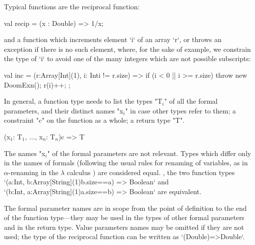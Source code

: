 \begin{ex}Typical functions are the reciprocal function: 
\begin{xten}
val recip = (x : Double) => 1/x;
\end{xten}
and a function which increments  element \xcd`i` of an array \xcd`r`, or throws an exception
if there is no such element, where, for the sake of example, we constrain the
type of \xcd`i` to avoid one of the many integers which are not possible subscripts:  
\begin{xten}
val inc = (r:Array[Int](1), i: Int{i != r.size}) => {
  if (i < 0 || i >= r.size) throw new DoomExn();
  r(i)++;
};
\end{xten}
\end{ex}

In general, a function type needs to list the types 
\xcdmath"T$_i$"
of all the formal parameters,
and their distinct names \xcdmath"x$_i$" in case other types refer to them; a
constraint 
\xcd"c" on the
function as a whole; a return type \xcd"T".

\begin{xtenmath}
(x$_1$: T$_1$, $\dots$, x$_n$: T$_n$){c} => T
\end{xtenmath}


The names \xcdmath"x$_i$" of the formal parameters are not relevant.  Types
which differ only in the names of formals (following the usual rules for
renaming of variables, as in {$\alpha$}-renaming in the {$\lambda$} calculus
) are considered equal.  \Eg, the two function types
\xcd`(a:Int, b:Array[String](1){b.size==a}) => Boolean`
and \\
\xcd`(b:Int, a:Array[String](1){a.size==b}) => Boolean`
are equivalent.


The formal parameter names are in scope from the point of definition to the
end of the function type---they may be used in the types of other formal parameters
and in the return type. 
Value parameters names may be
omitted if they are not used; the type of the reciprocal function can be
written as
\xcd`(Double)=>Double`. 

